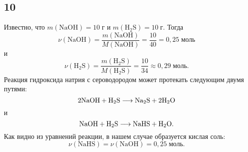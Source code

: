 \subsection{10}

Известно, что $m(\mathrm{NaOH})=10\;\text{г}$ и $m(\mathrm{H_2S})=10\;\text{г}$. Тогда
\[
\nu(\mathrm{NaOH})=\frac{m(\mathrm{NaOH})}{M(\mathrm{NaOH})}=\frac{10}{40}=0{,}25\;\text{моль}
\] 
и
\[
\nu(\mathrm{H_2S})=\frac{m(\mathrm{H_2S})}{M(\mathrm{H_2S})}=\frac{10}{34}\approx0{,}29\;\text{моль}.
\]
Реакция гидроксида натрия с сероводородом может протекать следующим двумя путями:
\[
\rm 2NaOH+H_2S\longrightarrow Na_2S+2H_2O
\]
и
\[
\rm NaOH+H_2S\longrightarrow NaHS+H_2O.
\]
Как видно из уравнений реакции, в нашем случае образуется кислая соль:
\[
\nu(\mathrm{NaHS})=\nu(\mathrm{NaOH})=0{,}25\;\text{моль}.
\]